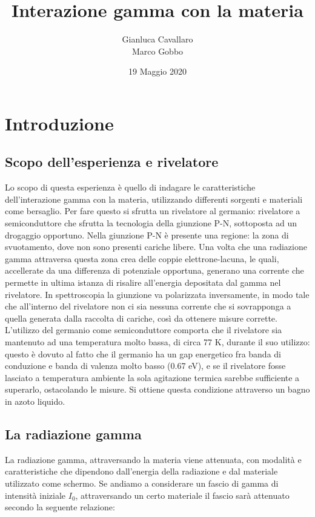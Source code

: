 \documentclass[a4paper,10pt]{article}
\title{Interazione gamma con la materia}
\author{Gianluca Cavallaro \\ Marco Gobbo}
\date{19 Maggio 2020}
\begin{document}
\maketitle


\section{Introduzione}
\subsection{Scopo dell'esperienza e rivelatore}
Lo scopo di questa esperienza \`e quello di indagare le caratteristiche dell'interazione gamma con la materia, utilizzando differenti sorgenti e materiali come bersaglio. Per fare questo si sfrutta un rivelatore al germanio: rivelatore a semiconduttore che sfrutta la tecnologia della giunzione P-N, sottoposta ad un drogaggio opportuno. Nella giunzione P-N \`e presente una regione: la zona di svuotamento, dove non sono presenti cariche libere. Una volta che una radiazione gamma attraversa questa zona crea delle coppie elettrone-lacuna, le quali, accellerate da una differenza di potenziale opportuna, generano una corrente che permette in ultima istanza di risalire all'energia depositata dal gamma nel rivelatore. In spettroscopia la giunzione va polarizzata inversamente, in modo tale che all'interno del rivelatore non ci sia nessuna corrente che si sovrapponga a quella generata dalla raccolta di cariche, cos\`i da ottenere misure corrette. L'utilizzo del germanio come semiconduttore comporta che il rivelatore sia mantenuto ad una temperatura molto bassa, di circa 77 K, durante il suo utilizzo: questo \`e dovuto al fatto che il germanio ha un gap energetico fra banda di conduzione e banda di valenza molto basso (0.67 eV), e se il rivelatore fosse lasciato a temperatura ambiente la sola agitazione termica sarebbe sufficiente a superarlo, ostacolando le misure. Si ottiene questa condizione attraverso un bagno in azoto liquido.

\subsection{La radiazione gamma}
\noindent La radiazione gamma, attraversando la materia viene attenuata, con modalit\`a e caratteristiche che dipendono dall'energia della radiazione e dal materiale utilizzato come schermo. Se andiamo a considerare un fascio di gamma di intensità iniziale $I_0$, attraversando un certo materiale il fascio sarà attenuato secondo la seguente relazione:
\end{document}
